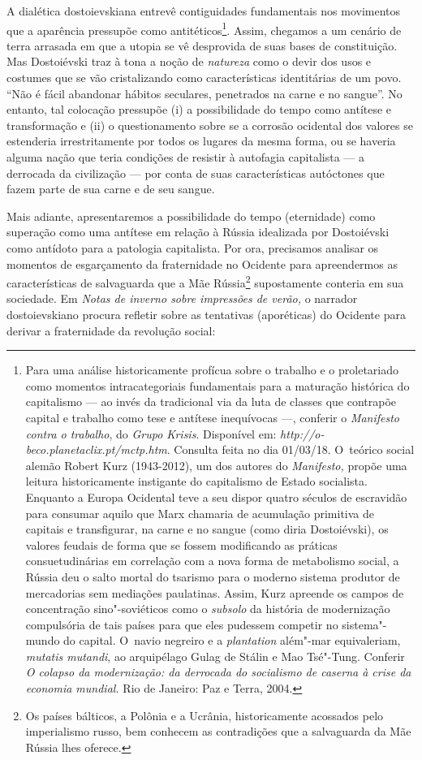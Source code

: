 A dialética dostoievskiana entrevê contiguidades fundamentais nos
movimentos que a aparência pressupõe como antitéticos\footnote{Para uma
  análise historicamente profícua sobre o trabalho e o proletariado como
  momentos intracategoriais fundamentais para a maturação histórica do
  capitalismo --- ao invés da tradicional via da luta de classes que
  contrapõe capital e trabalho como tese e antítese inequívocas ---,
  conferir o \emph{Manifesto contra o trabalho}, do \emph{Grupo Krisis}.
  Disponível em:
  \emph{http://o-beco.planetaclix.pt/mctp.htm}.
  Consulta feita no dia 01/03/18. O~teórico social alemão Robert Kurz
  (1943-2012), um dos autores do \emph{Manifesto,} propõe uma leitura
  historicamente instigante do capitalismo de Estado socialista.
  Enquanto a Europa Ocidental teve a seu dispor quatro séculos de
  escravidão para consumar aquilo que Marx chamaria de acumulação
  primitiva de capitais e transfigurar, na carne e no sangue (como diria
  Dostoiévski), os valores feudais de forma que se fossem modificando as
  práticas consuetudinárias em correlação com a nova forma de
  metabolismo social, a Rússia deu o salto mortal do tsarismo para o
  moderno sistema produtor de mercadorias sem mediações paulatinas.
  Assim, Kurz apreende os campos de concentração sino"-soviéticos como o
  \emph{subsolo} da história de modernização compulsória de tais países
  para que eles pudessem competir no sistema"-mundo do capital. O~navio
  negreiro e a \emph{plantation} além"-mar equivaleriam, \emph{mutatis
  mutandi}, ao arquipélago Gulag de Stálin e Mao Tsé"-Tung. Conferir
  \emph{O colapso da modernização: da derrocada do socialismo de caserna
  à crise da economia mundial.} Rio de Janeiro: Paz e Terra, 2004.}.
Assim, chegamos a um cenário de terra arrasada em que a utopia se vê
desprovida de suas bases de constituição. Mas Dostoiévski traz à tona a
noção de \emph{natureza} como o devir dos usos e costumes que se vão
cristalizando como características identitárias de um povo. ``Não é
fácil abandonar hábitos seculares, penetrados na carne e no sangue''. No
entanto, tal colocação pressupõe (i) a possibilidade do tempo como
antítese e transformação e (ii) o questionamento sobre se a corrosão
ocidental dos valores se estenderia irrestritamente por todos os lugares
da mesma forma, ou se haveria alguma nação que teria condições de
resistir à autofagia capitalista --- a derrocada da civilização --- por
conta de suas características autóctones que fazem parte de sua carne e
de seu sangue.

Mais adiante, apresentaremos a possibilidade do tempo (eternidade) como
superação como uma antítese em relação à Rússia idealizada por
Dostoiévski como antídoto para a patologia capitalista. Por ora,
precisamos analisar os momentos de esgarçamento da fraternidade no
Ocidente para apreendermos as características de salvaguarda que a Mãe
Rússia\footnote{Os países bálticos, a Polônia e a Ucrânia,
  historicamente acossados pelo imperialismo russo, bem conhecem as
  contradições que a salvaguarda da Mãe Rússia lhes oferece.}
supostamente conteria em sua sociedade. Em \emph{Notas de inverno sobre
impressões de verão,} o narrador dostoievskiano procura refletir sobre
as tentativas (aporéticas) do Ocidente para derivar a fraternidade da
revolução social:

